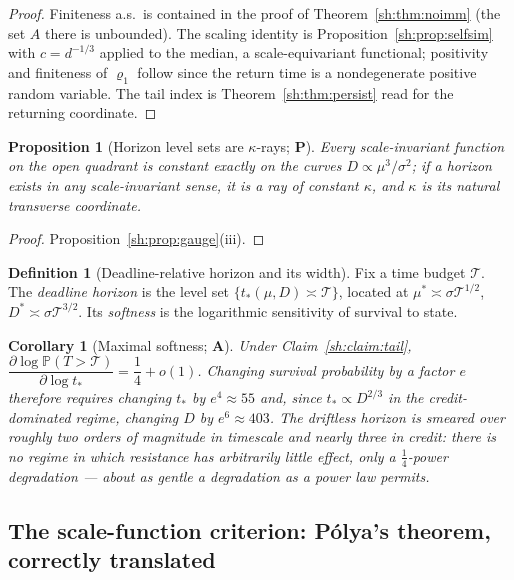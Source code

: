 \documentclass[11pt]{article}
\numberwithin{equation}{section}
\theoremstyle{plain}
\newtheorem{proposition}[theorem]{Proposition}
\newtheorem{corollary}[theorem]{Corollary}
\theoremstyle{definition}
\newtheorem{definition}[theorem]{Definition}
\theoremstyle{remark}
\newcommand{\PP}{\mathbb{P}}
\begin{document}
\begin{proof}
Finiteness a.s.\ is contained in the proof of
Theorem~\ref{sh:thm:noimm} (the set $A$ there is unbounded). The scaling
identity is Proposition~\ref{sh:prop:selfsim} with $c=d^{-1/3}$ applied to
the median, a scale-equivariant functional; positivity and finiteness of
$\varrho_1$ follow since the return time is a nondegenerate positive random
variable. The tail index is Theorem~\ref{sh:thm:persist} read for the
returning coordinate.
\end{proof}

\begin{proposition}[Horizon level sets are $\kappa$-rays; \textbf{P}]
\label{sh:prop:rays}
Every scale-invariant function on the open quadrant is constant exactly on
the curves $D\propto\mu^3/\sigma^2$; if a horizon exists in any
scale-invariant sense, it is a ray of constant $\kappa$, and $\kappa$ is
its natural transverse coordinate.
\end{proposition}

\begin{proof}
Proposition~\ref{sh:prop:gauge}(iii).
\end{proof}

\begin{definition}[Deadline-relative horizon and its width]
\label{sh:def:deadline}
Fix a time budget $\mathcal T$. The \emph{deadline horizon} is the level
set $\{t_*(\mu,D)\asymp\mathcal T\}$, located at
$\mu^*\asymp\sigma\mathcal T^{1/2}$, $D^*\asymp\sigma\mathcal T^{3/2}$.
Its \emph{softness} is the logarithmic sensitivity of survival to state.
\end{definition}

\begin{corollary}[Maximal softness; \textbf{A}]\label{sh:cor:soft}
Under Claim~\ref{sh:claim:tail},
$\dfrac{\partial\log\PP(T>\mathcal T)}{\partial\log t_*}=\dfrac14+o(1)$.
Changing survival probability by a factor $e$ therefore requires changing
$t_*$ by $e^4\approx55$ and, since $t_*\propto D^{2/3}$ in the
credit-dominated regime, changing $D$ by $e^6\approx403$. The driftless
horizon is smeared over roughly two orders of magnitude in timescale and
nearly three in credit: there is no regime in which resistance has
arbitrarily little effect, only a $\tfrac14$-power degradation --- about as
gentle a degradation as a power law permits.
\end{corollary}

\subsection{The scale-function criterion: P\'olya's theorem, correctly
translated}\label{sh:subsub:scale}
\end{document}
